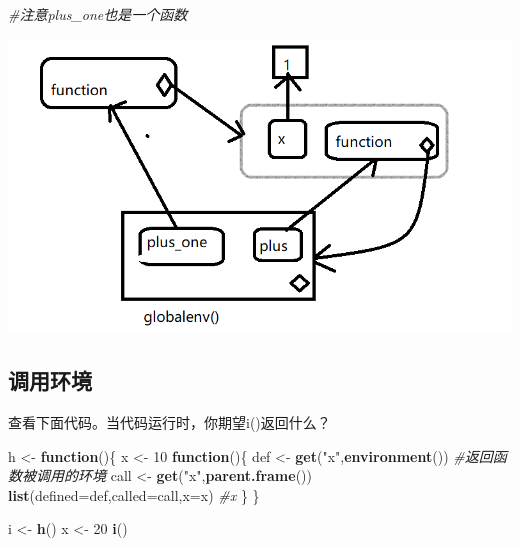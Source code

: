 \documentclass[]{book}
\newenvironment{Shaded}{\begin{snugshade}}{\end{snugshade}}
\newcommand{\KeywordTok}[1]{\textcolor[rgb]{0.13,0.29,0.53}{\textbf{#1}}}
\newcommand{\DataTypeTok}[1]{\textcolor[rgb]{0.13,0.29,0.53}{#1}}
\newcommand{\DecValTok}[1]{\textcolor[rgb]{0.00,0.00,0.81}{#1}}
\newcommand{\StringTok}[1]{\textcolor[rgb]{0.31,0.60,0.02}{#1}}
\newcommand{\CommentTok}[1]{\textcolor[rgb]{0.56,0.35,0.01}{\textit{#1}}}
\newcommand{\ControlFlowTok}[1]{\textcolor[rgb]{0.13,0.29,0.53}{\textbf{#1}}}
\newcommand{\NormalTok}[1]{#1}
\begin{document}
\begin{Shaded}
\begin{Highlighting}[]
\CommentTok{#注意plus_one也是一个函数}
\end{Highlighting}
\end{Shaded}

\begin{center}\includegraphics{img/ch7-13} \end{center}

\subsection{调用环境}

查看下面代码。当代码运行时，你期望i()返回什么？

\begin{Shaded}
\begin{Highlighting}[]
\NormalTok{h <-}\StringTok{ }\ControlFlowTok{function}\NormalTok{()\{}
\NormalTok{  x <-}\StringTok{ }\DecValTok{10}
  \ControlFlowTok{function}\NormalTok{()\{}
\NormalTok{    def <-}\StringTok{ }\KeywordTok{get}\NormalTok{(}\StringTok{"x"}\NormalTok{,}\KeywordTok{environment}\NormalTok{())}
    \CommentTok{#返回函数被调用的环境}
\NormalTok{    call <-}\StringTok{ }\KeywordTok{get}\NormalTok{(}\StringTok{"x"}\NormalTok{,}\KeywordTok{parent.frame}\NormalTok{())}
    \KeywordTok{list}\NormalTok{(}\DataTypeTok{defined=}\NormalTok{def,}\DataTypeTok{called=}\NormalTok{call,}\DataTypeTok{x=}\NormalTok{x)}
    \CommentTok{#x}
\NormalTok{  \}}
\NormalTok{\}}

\NormalTok{i <-}\StringTok{ }\KeywordTok{h}\NormalTok{()}
\NormalTok{x <-}\StringTok{ }\DecValTok{20}
\KeywordTok{i}\NormalTok{()}
\end{Highlighting}
\end{Shaded}
\end{document}

